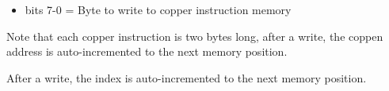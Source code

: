 \begin{itemize}
\item bits 7-0 = Byte to write to copper instruction memory
\end{itemize}
Note that each copper instruction is two bytes long, after a write,
the coppen address is auto-incremented to the next memory position.

After a write, the index is auto-incremented to the next memory position.

